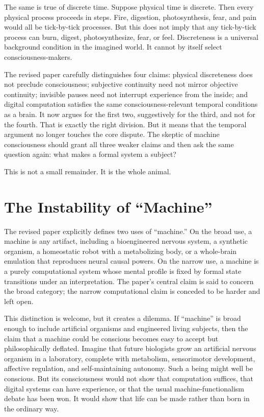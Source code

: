 \documentclass[11pt]{article}
\begin{document}
The same is true of discrete time. Suppose physical time is discrete. Then every physical process proceeds in steps. Fire, digestion, photosynthesis, fear, and pain would all be tick-by-tick processes. But this does not imply that any tick-by-tick process can burn, digest, photosynthesize, fear, or feel. Discreteness is a universal background condition in the imagined world. It cannot by itself select consciousness-makers.

The revised paper carefully distinguishes four claims: physical discreteness does not preclude consciousness; subjective continuity need not mirror objective continuity; invisible pauses need not interrupt experience from the inside; and digital computation satisfies the same consciousness-relevant temporal conditions as a brain. It now argues for the first two, suggestively for the third, and not for the fourth. That is exactly the right division. But it means that the temporal argument no longer touches the core dispute. The skeptic of machine consciousness should grant all three weaker claims and then ask the same question again: what makes a formal system a subject?

This is not a small remainder. It is the whole animal.

\section{The Instability of ``Machine''}

The revised paper explicitly defines two uses of ``machine.'' On the broad use, a machine is any artifact, including a bioengineered nervous system, a synthetic organism, a homeostatic robot with a metabolizing body, or a whole-brain emulation that reproduces neural causal powers. On the narrow use, a machine is a purely computational system whose mental profile is fixed by formal state transitions under an interpretation. The paper's central claim is said to concern the broad category; the narrow computational claim is conceded to be harder and left open.

This distinction is welcome, but it creates a dilemma. If ``machine'' is broad enough to include artificial organisms and engineered living subjects, then the claim that a machine could be conscious becomes easy to accept but philosophically deflated. Imagine that future biologists grow an artificial nervous organism in a laboratory, complete with metabolism, sensorimotor development, affective regulation, and self-maintaining autonomy. Such a being might well be conscious. But its consciousness would not show that computation suffices, that digital systems can have experience, or that the usual machine-functionalism debate has been won. It would show that life can be made rather than born in the ordinary way.
\end{document}
